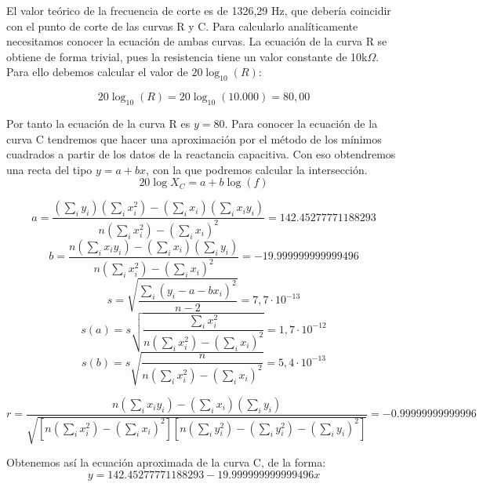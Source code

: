\documentclass[a4paper,12pt,titlepage]{article}
\begin{document}
El valor teórico de la frecuencia de corte es de 1326,29 Hz, que debería coincidir con el punto de corte de las curvas R y C. Para calcularlo analíticamente necesitamos conocer la ecuación de ambas curvas. La ecuación de la curva R se obtiene de forma trivial, pues la resistencia tiene un valor constante de 10k$\Omega$. Para ello debemos calcular el valor de $20\log_{10}(R)$:

\begin{equation}
    20\log_{10}(R)=20\log_{10}(10.000)=80,00
\end{equation}

Por tanto la ecuación de la curva R es $y=80$. Para conocer la ecuación de la curva C tendremos que hacer una aproximación por el método de los mínimos cuadrados a partir de los datos de la reactancia capacitiva. Con eso obtendremos una recta del tipo $y=a+bx$, con la que podremos calcular la intersección.
\begin{equation}
    20\log X_{C}=a+b\log(f)
\end{equation}

\begin{equation}
    a=\frac{(\sum_{i}y_{i})(\sum_{i}x_{i}^2)-(\sum_{i}x_{i})(\sum_{i}x_{i}y_{i})}{n(\sum_ix_{i}^2)-(\sum_{i}x_{i})^2}=142.45277771188293
\end{equation}
\begin{equation}
    b=\frac{n(\sum_{i}x_{i}y_{i})-(\sum_{i}x_{i})(\sum_{i}y_{i})}{n(\sum_{i}x_{i}^2)-(\sum_{i}x_{i})^2}=-19.999999999999496
\end{equation}
\begin{equation}
    s=\sqrt{\frac{\sum_{i}(y_{i}-a-bx_{i})^2}{n-2}}=7,7 \cdot 10^{-13}
\end{equation}
\begin{equation}
    s(a)=s\sqrt{\frac{\sum_{i}x_{i}^2}{n(\sum_{i}x_{i}^2)-(\sum_{i}x_{i})^2}}=1,7 \cdot 10^{-12}
\end{equation}
\begin{equation}
    s(b)=s\sqrt{\frac{n}{n(\sum_{i}x_{i}^2)-(\sum_{i}x_{i})^2}}=5,4 \cdot 10^{-13}
\end{equation}

\begin{equation}
    r=\frac{n(\sum_{i}x_{i}y_{i})-(\sum_{i}x_{i})(\sum_{i}y_{i})}{\sqrt{[n(\sum_{i}x_{i}^2)-(\sum_{i}x_{i})^2][n(\sum_{i}y_{i}^2)-(\sum_{i}y_{i}^2)-(\sum_{i}y_{i})^2]}}=-0.99999999999996
\end{equation}

Obtenemos así la ecuación aproximada de la curva C, de la forma:
\begin{equation}
    y=142.45277771188293-19.999999999999496x
\end{equation}
\end{document}
